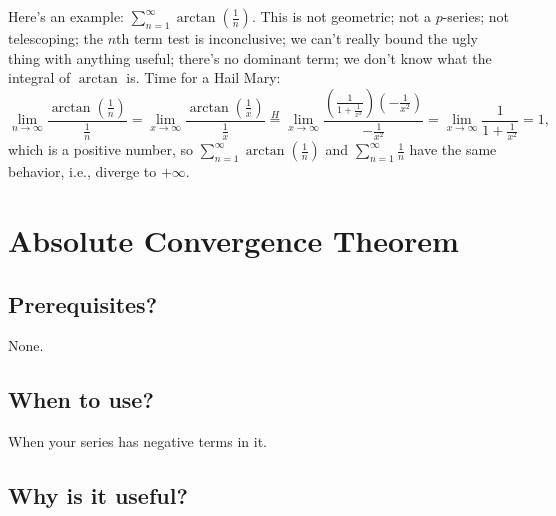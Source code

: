 \documentclass[11pt]{article}
\begin{document}
\noindent Here's an example: $\displaystyle \sum_{n=1}^\infty
\arctan\left(\frac1n\right)$. This is not geometric; not a $p$-series; not
telescoping; the $n$th term test is inconclusive; we can't really bound the ugly
thing with anything useful; there's no dominant term; we don't know what the
integral of $\arctan$ is. Time for a Hail Mary: \[
  \lim_{n\to\infty}\frac{\displaystyle\arctan\left(\frac1n\right)}{\displaystyle\frac1n}
  =\lim_{x\to\infty}\frac{\displaystyle\arctan\left(\frac1x\right)}{\displaystyle\frac1x}
  \stackrel{H}{=}\lim_{x\to\infty}\frac{\displaystyle\left(\frac1{1+\frac1{x^2}}\right)\left(-\frac1{x^2}\right)}
  {\displaystyle-\frac1{x^2}}
  =\lim_{x\to\infty}\frac1{1+\displaystyle\frac1{x^2}}=1,
\]
which is a positive number, so $\displaystyle\sum_{n=1}^\infty
\arctan\left(\frac1n\right)$ and $\displaystyle\sum_{n=1}^\infty \frac1n$ have
the same behavior, i.e., diverge to $+\infty$.

\newpage
\section{Absolute Convergence Theorem}

\subsection{Prerequisites?}

None.

\subsection{When to use?}

When your series has negative terms in it.

\subsection{Why is it useful?}
\end{document}
